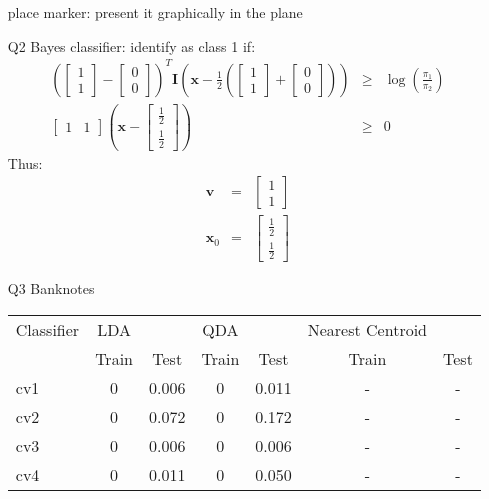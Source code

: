 \documentclass{article}
\begin{document}
\begin{itemize}
place marker: present it graphically in the plane

\item[Q2]
Bayes classifier: identify as class 1 if:
\begin{eqnarray*}
\left(\begin{bmatrix}1 \\ 1 \end{bmatrix} - \begin{bmatrix} 0 \\ 0 \end{bmatrix}\right)^T
\mathbf{I} \left(\mathbf{x} - \frac{1}{2}\left(\begin{bmatrix}1 \\ 1 \end{bmatrix} + \begin{bmatrix} 0 \\ 0 \end{bmatrix}\right)\right) & \ge & \log\left(\frac{\pi_1}{\pi_2}\right) \\
\begin{bmatrix}
1 & 1
\end{bmatrix}\left(\mathbf{x} - \begin{bmatrix}
\frac{1}{2} \\ \frac{1}{2}
\end{bmatrix}\right) & \ge & 0
\end{eqnarray*}
Thus:
\begin{eqnarray}
\mathbf{v} & = & \begin{bmatrix} 1 \\ 1 \end{bmatrix} \\
\mathbf{x}_0 & = & \begin{bmatrix} \frac{1}{2} \\ \frac{1}{2} \end{bmatrix} 
\end{eqnarray}
\item[Q3]
Banknotes
\newline
\begin{tabular}{l | c c | c c | c c |}
Classifier & LDA && QDA && Nearest Centroid  & \\
& Train & Test & Train & Test & Train & Test \\
\hline
cv1 & 0 & 0.006 & 0 & 0.011 & - & - \\
cv2 & 0 & 0.072 & 0 & 0.172 & - & - \\
cv3 & 0 & 0.006 & 0 & 0.006 & - & - \\
cv4 & 0 & 0.011 & 0 & 0.050 & - & - \\

\end{tabular}
\end{itemize}
\end{document}

